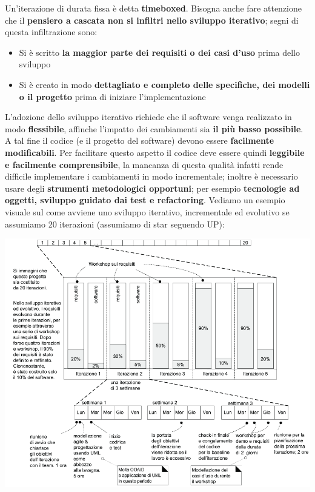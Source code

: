 \documentclass[12pt]{article}
\begin{document}
Un'iterazione di durata fissa è detta \textbf{timeboxed}. \newline
Bisogna anche fare attenzione che il \textbf{pensiero a cascata non si infiltri nello sviluppo iterativo}; segni di questa infiltrazione sono:
\begin{itemize}
    \item Si è scritto \textbf{la maggior parte dei requisiti o dei casi d'uso} prima dello sviluppo
    \item Si è creato in modo \textbf{dettagliato e completo delle specifiche, dei modelli o il progetto} prima di iniziare l'implementazione 
\end{itemize}
L'adozione dello sviluppo iterativo richiede che il software venga realizzato in modo \textbf{flessibile}, affinche l'impatto dei cambiamenti sia \textbf{il più basso possibile}. A tal fine il codice (e il progetto del software) devono essere \textbf{facilmente modificabili}.
Per facilitare questo aspetto il codice deve essere quindi \textbf{leggibile e facilmente comprensibile}, la mancanza di questa qualità infatti rende difficile implementare i cambiamenti in modo incrementale; inoltre è necessario usare degli \textbf{strumenti metodologici opportuni}; per esempio \textbf{tecnologie ad oggetti, sviluppo guidato dai test e refactoring}.
Vediamo un esempio visuale sul come avviene uno sviluppo iterativo, incrementale ed evolutivo se assumiamo 20 iterazioni (assumiamo di star seguendo UP):
\begin{center}
    \includegraphics[width = 1.10\textwidth]{Images/17.png}
\end{center}
\end{document}
